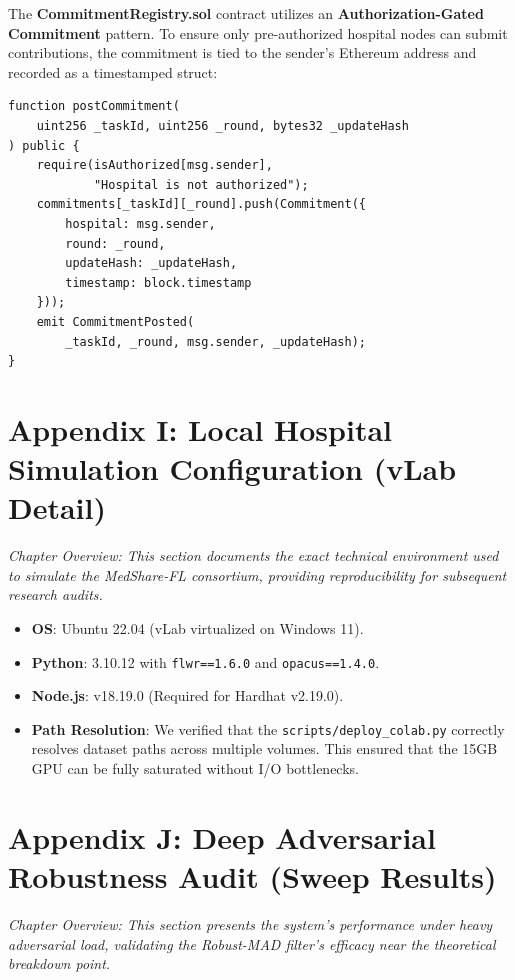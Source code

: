 \documentclass[10pt, a4paper, twocolumn]{article}
\begin{document}
The \textbf{CommitmentRegistry.sol} contract utilizes an \textbf{Authorization-Gated Commitment} pattern. To ensure only pre-authorized hospital nodes can submit contributions, the commitment is tied to the sender's Ethereum address and recorded as a timestamped struct:
\begin{lstlisting}[language=Solidity, caption={MedShare-FL Smart Contract Logic}]
function postCommitment(
    uint256 _taskId, uint256 _round, bytes32 _updateHash
) public {
    require(isAuthorized[msg.sender],
            "Hospital is not authorized");
    commitments[_taskId][_round].push(Commitment({
        hospital: msg.sender,
        round: _round,
        updateHash: _updateHash,
        timestamp: block.timestamp
    }));
    emit CommitmentPosted(
        _taskId, _round, msg.sender, _updateHash);
}
\end{lstlisting}

\section*{Appendix I: Local Hospital Simulation Configuration (vLab Detail)}
\textit{Chapter Overview: This section documents the exact technical environment used to simulate the MedShare-FL consortium, providing reproducibility for subsequent research audits.}

\begin{itemize}
    \item \textbf{OS}: Ubuntu 22.04 (vLab virtualized on Windows 11).
    \item \textbf{Python}: 3.10.12 with \texttt{flwr==1.6.0} and \texttt{opacus==1.4.0}.
    \item \textbf{Node.js}: v18.19.0 (Required for Hardhat v2.19.0).
    \item \textbf{Path Resolution}: We verified that the \texttt{scripts/deploy\_colab.py} correctly resolves dataset paths across multiple volumes. This ensured that the 15GB GPU can be fully saturated without I/O bottlenecks.
\end{itemize}

\section*{Appendix J: Deep Adversarial Robustness Audit (Sweep Results)}
\textit{Chapter Overview: This section presents the system's performance under heavy adversarial load, validating the Robust-MAD filter's efficacy near the theoretical breakdown point.}
\end{document}
